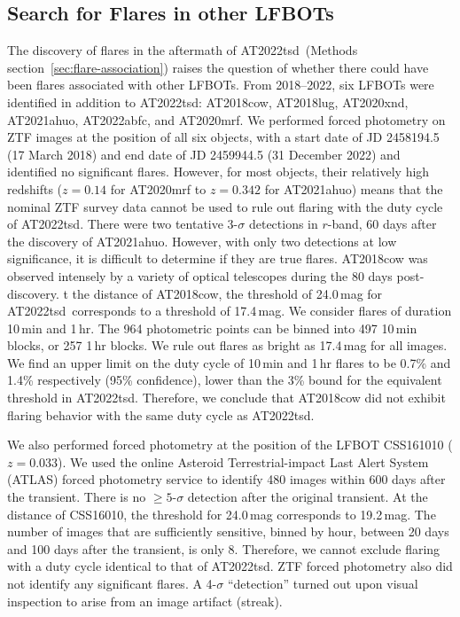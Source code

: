 \documentclass{nature_plusfigure}
\newcommand{\at}{AT2022tsd}
\begin{document}
\begin{methods}
\section{Search for Flares in other LFBOTs}
\label{sec:flare-search}

The discovery of flares in the aftermath of \at\ (Methods section~\ref{sec:flare-association}) raises the question of whether there could have been flares associated with other LFBOTs. 
From 2018--2022, six LFBOTs were identified in addition to \at: AT2018cow\cite{Prentice2018}, AT2018lug\cite{Ho2020_Koala}, AT2020xnd\cite{Perley2021}, AT2021ahuo, AT2022abfc\cite{Ho2022_AT2022abfc},  
and AT2020mrf\cite{Yao2022}. 
We performed forced photometry on ZTF images at the position of all six objects, with a start date of JD 2458194.5 (17 March 2018) and end date of JD 2459944.5 (31 December 2022) and identified no significant flares.
However, for most objects, their relatively high redshifts ($z=0.14$ for AT2020mrf\cite{Yao2022} to $z=0.342$ for AT2021ahuo) means that the nominal ZTF survey data cannot be used to rule out flaring with the duty cycle of \at.
There were two tentative 3-$\sigma$ detections in $r$-band, 60 days after the discovery of AT2021ahuo. However, with only two detections at low significance, it is difficult to determine if they are true flares.
AT2018cow was observed intensely by a variety of optical telescopes during the 80 days post-discovery\cite{Perley2019}. t the distance of AT2018cow, the threshold of 24.0\,mag for \at\ corresponds to a threshold of 17.4\,mag. We consider flares of duration 10\,min and 1\,hr. The 964 photometric points can be binned into 497 10\,min blocks, or 257 1\,hr blocks. We rule out flares as bright as 17.4\,mag for all images. We find an upper limit on the duty cycle of 10\,min and 1\,hr flares to be 0.7\% and 1.4\% respectively (95\% confidence), lower than the 3\% bound for the equivalent threshold in \at. Therefore, we conclude that AT2018cow did not exhibit flaring behavior with the same duty cycle as \at.

We also performed forced photometry at the position of the LFBOT CSS161010\cite{Coppejans2020} ($z=0.033$). 
We used the online Asteroid Terrestrial-impact Last Alert System (ATLAS)\cite{Tonry2018,Smith2020} forced photometry service\cite{Shingles2021} to identify 480 images within 600 days after the transient. There is no $\geq5$-$\sigma$ detection after the original transient. At the distance of CSS16010, the threshold for 24.0\,mag corresponds to 19.2\,mag. The number of images that are sufficiently sensitive, binned by hour, between 20 days and 100 days after the transient, is only 8. Therefore, we cannot exclude flaring with a duty cycle identical to that of \at.
ZTF forced photometry also did not identify any significant flares. A 4-$\sigma$ ``detection'' turned out upon visual inspection to arise from an image artifact (streak). 


\end{methods}
\end{document}
